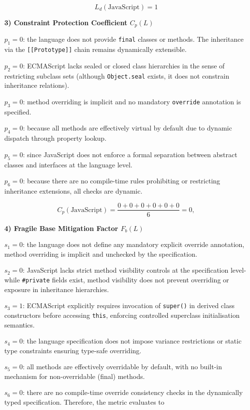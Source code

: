 \[
    L_d(\text{JavaScript}) = 1
\]

\textbf{3) Constraint Protection Coefficient $C_p(L)$}

$p_1=0$: the language does not provide \texttt{final} classes or methods. The inheritance via the \texttt{[[Prototype]]} chain remains dynamically extensible. 

$p_2=0$: ECMAScript lacks sealed or closed class hierarchies in the sense of restricting subclass sets (although \texttt{Object.seal} exists, it does not constrain inheritance relations). 

$p_3=0$: method overriding is implicit and no mandatory \texttt{override} annotation is specified. 

$p_4=0$: because all methods are effectively virtual by default due to dynamic dispatch through property lookup. 

$p_5=0$: since JavaScript does not enforce a formal separation between abstract classes and interfaces at the language level. 

$p_6=0$: because there are no compile-time rules prohibiting or restricting inheritance extensions, all checks are dynamic.

\[
    C_p(\text{JavaScript}) = \frac{0+0+0+0+0+0}{6} = 0,
\]

\textbf{4) Fragile Base Mitigation Factor $F_b(L)$}

$s_1=0$: the language does not define any mandatory explicit override annotation, method overriding is implicit and unchecked by the specification. 

$s_2=0$: JavaScript lacks strict method visibility controls at the specification level-while \texttt{\#private} fields exist, method visibility does not prevent overriding or exposure in inheritance hierarchies. 

$s_3=1$: ECMAScript explicitly requires invocation of \texttt{super()} in derived class constructors before accessing \texttt{this}, enforcing controlled superclass initialisation semantics. 

$s_4=0$: the language specification does not impose variance restrictions or static type constraints ensuring type-safe overriding. 

$s_5=0$: all methods are effectively overridable by default, with no built-in mechanism for non-overridable (final) methods. 

$s_6=0$: there are no compile-time override consistency checks in the dynamically typed specification. Therefore, the metric evaluates to

